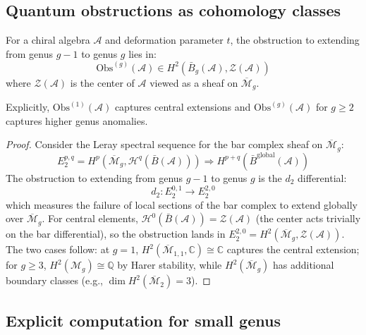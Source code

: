 \subsection{Quantum obstructions as cohomology classes}

\begin{theorem}
\label{thm:obstruction-quantum}
For a chiral algebra $\mathcal{A}$ and deformation parameter $t$, the obstruction to extending from genus $g-1$ to genus $g$ lies in:
\begin{equation}
\text{Obs}^{(g)}(\mathcal{A}) \in H^2(\bar{B}_g(\mathcal{A}), \mathcal{Z}(\mathcal{A}))
\end{equation}
where $\mathcal{Z}(\mathcal{A})$ is the center of $\mathcal{A}$ viewed as a sheaf on $\overline{\mathcal{M}}_g$.

Explicitly, $\text{Obs}^{(1)}(\mathcal{A})$ captures central extensions and $\text{Obs}^{(g)}(\mathcal{A})$ for $g \geq 2$ captures higher genus anomalies.
\end{theorem}

\begin{proof}
Consider the Leray spectral sequence for the bar complex sheaf on $\overline{\mathcal{M}}_g$:
\begin{equation}
E_2^{p,q} = H^p(\overline{\mathcal{M}}_g, \mathcal{H}^q(\bar{B}(\mathcal{A}))) \Rightarrow H^{p+q}(\bar{B}^{\text{global}}(\mathcal{A}))
\end{equation}
The obstruction to extending from genus $g-1$ to genus $g$ is the $d_2$ differential:
\begin{equation}
d_2: E_2^{0,1} \to E_2^{2,0}
\end{equation}
which measures the failure of local sections of the bar complex to extend globally over $\overline{\mathcal{M}}_g$.
For central elements, $\mathcal{H}^0(\bar{B}(\mathcal{A})) = \mathcal{Z}(\mathcal{A})$ (the center acts trivially on the bar differential), so the obstruction lands in $E_2^{2,0} = H^2(\overline{\mathcal{M}}_g, \mathcal{Z}(\mathcal{A}))$. The two cases follow: at $g=1$, $H^2(\overline{\mathcal{M}}_{1,1}, \mathbb{C}) \cong \mathbb{C}$ captures the central extension; for $g \geq 3$, $H^2(\mathcal{M}_g) \cong \mathbb{Q}$ by Harer stability, while $H^2(\overline{\mathcal{M}}_g)$ has additional boundary classes (e.g., $\dim H^2(\overline{\mathcal{M}}_2) = 3$).
\end{proof}

\subsection{Explicit computation for small genus}

